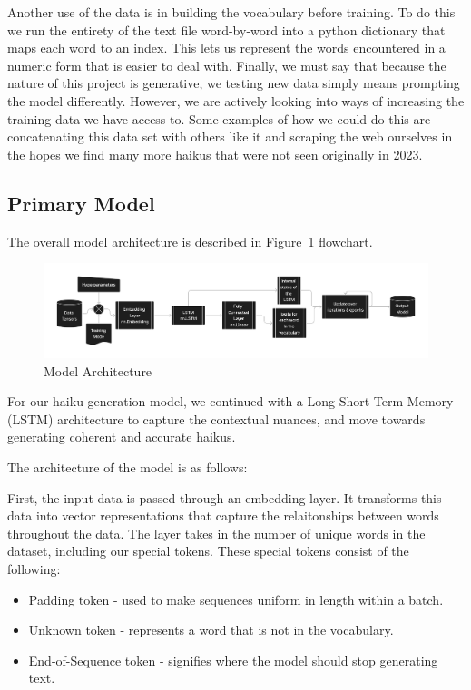 \documentclass{article} %
\begin{document}
Another use of the data is in building the vocabulary before training.
To do this we run the entirety of the text file word-by-word into a python dictionary that maps each word to an index.
This lets us represent the words encountered in a numeric form that is easier to deal with.
Finally, we must say that because the nature of this project is generative,
we testing new data simply means prompting the model differently.
However, we are actively looking into ways of increasing the training data we have access to.
Some examples of how we could do this are concatenating this data set with others like it
and scraping the web ourselves in the hopes we find many more haikus that were not seen originally in 2023.


\subsection{Primary Model}

The overall model architecture is described in Figure~\ref{fig:flowchart} flowchart.

\begin{figure}[h]
  \begin{center}
  \includegraphics[width=1\textwidth]{Figs/HaikuLSTMArch.png}
  \end{center}
  \caption{Model Architecture}
  \label{fig:flowchart}
  \end{figure}

For our haiku generation model, we continued with a Long Short-Term Memory (LSTM) architecture to capture the contextual nuances, and move towards generating coherent and accurate haikus.

The architecture of the model is as follows:

First, the input data is passed through an embedding layer. 
It transforms this data into vector representations that capture the 
relaitonships between words throughout the data. 
The layer takes in the number of unique words in the dataset, 
including our special tokens. 
These special tokens consist of the following:
\begin{itemize}
  \item Padding token - used to make sequences uniform in length within a batch.
  \item Unknown token - represents a word that is not in the vocabulary.
  \item End-of-Sequence token - signifies where the model should stop generating text.
\end{itemize}
\end{document}
